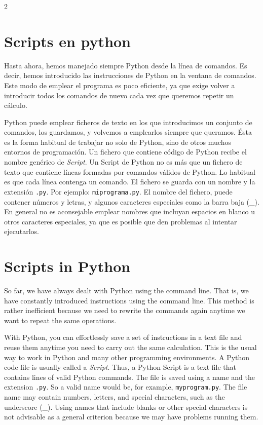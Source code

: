 \begin{paracol}{2}
\section[Scripts en Python]{Scripts en python} 

Hasta ahora, hemos manejado siempre Py\-thon desde la línea de comandos. Es decir, hemos introducido las instrucciones de Python en la ventana de comandos. Este modo de emplear el programa es poco eficiente, ya que exige volver a introducir todos los comandos de nuevo cada vez que queremos repetir un cálculo.

Python puede emplear ficheros de texto en los que introducimos un conjunto de comandos, los guardamos, y volvemos a emplearlos siempre que queramos. Ésta es la forma habitual de trabajar no solo de Python, sino de otros muchos entornos de programación. Un fichero que contiene código de Python recibe el nombre genérico de \emph{Script}. Un Script de Python  no es más que un fichero de texto que contiene líneas formadas por comandos válidos de Python. Lo habitual es que cada línea contenga un comando. El fichero se guarda con un nombre y la extensión \texttt{.py}. Por ejemplo: \texttt{miprograma.py}. El nombre del fichero, puede contener números y letras, y algunos caracteres especiales como la barra baja (\_). En general no es aconsejable emplear nombres que incluyan espacios en blanco u otros caracteres especiales, ya que es posible que den problemas al intentar ejecutarlos.  

\switchcolumn
\section[Scripts in Python ]{Scripts in Python } 
So far, we have always dealt with Python using the command line. That is, we have constantly introduced instructions using the command line. This method is rather inefficient because we need to rewrite the commands again anytime we want to repeat the same operations.

With Python, you can effortlessly save a set of instructions in a text file and reuse them anytime you need to carry out the same calculation. This is the usual way to work in Python and many other programming environments. A Python code file is usually called a \emph{Script}. Thus, a Python Script is a text file that contains lines of valid Python commands. The file is saved using a name and the extension \texttt{.py}. So a valid name would be, for example, \texttt{myprogram.py}. The file name may contain numbers, letters, and special characters, such as the underscore (\_). Using names that include blanks or other special characters is not advisable as a general criterion because we may have problems running them.
\end{paracol}

